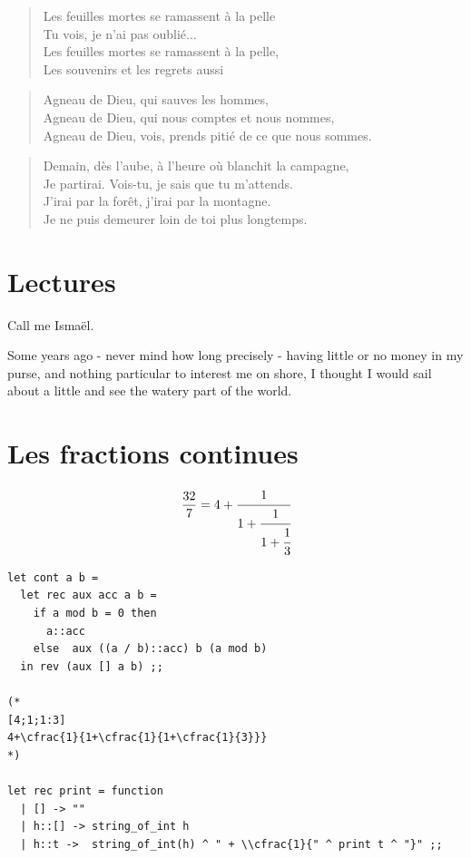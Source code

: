 \begin{verse}
	Les feuilles mortes se ramassent à la pelle \\
	Tu vois, je n'ai pas oublié... \\
	Les feuilles mortes se ramassent à la pelle, \\
	Les souvenirs et les regrets aussi \\
\end{verse}

\begin{verse}
	Agneau de Dieu, qui sauves les hommes, \\
	Agneau de Dieu, qui nous comptes et nous nommes, \\
	Agneau de Dieu, vois, prends pitié de ce que nous sommes. \\
\end{verse}

\begin{verse}
	Demain, dès l'aube, à l'heure où blanchit la campagne, \\
	Je partirai. Vois-tu, je sais que tu m'attends. \\
	J'irai par la forêt, j'irai par la montagne. \\
	Je ne puis demeurer loin de toi plus longtemps. \\
\end{verse}

\section{Lectures}
Call me Ismaël. \cite{moby}

Some years ago - never mind how long precisely - having little or no money in my purse, 
and nothing particular to interest me on shore,
I thought I would sail about a little and see the watery part of the world. 
\section{Les fractions continues}

$$
\frac{32}{7} = 4+\cfrac{1}{1+\cfrac{1}{1+\cfrac{1}{3}}}
$$


\begin{Verbatim}
let cont a b =
  let rec aux acc a b =
    if a mod b = 0 then
      a::acc
    else  aux ((a / b)::acc) b (a mod b)
  in rev (aux [] a b) ;;

(* 
[4;1;1:3]
4+\cfrac{1}{1+\cfrac{1}{1+\cfrac{1}{3}}}
*)

let rec print = function
  | [] -> ""
  | h::[] -> string_of_int h 
  | h::t ->  string_of_int(h) ^ " + \\cfrac{1}{" ^ print t ^ "}" ;;
\end{Verbatim}

